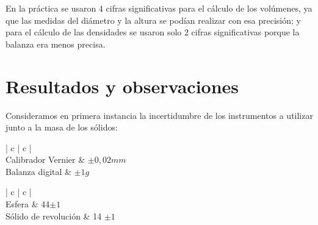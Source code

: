 \documentclass[a4paper]{article}
\begin{document}
En la práctica se usaron 4 cifras significativas para el cálculo de los volúmenes, ya que las medidas del diámetro y la altura se podían realizar con esa precisión; y para el cálculo de las densidades se usaron solo 2 cifras significativas porque la balanza era menos precisa. 

\section{Resultados y observaciones}
Consideramos en primera instancia la incertidumbre de los instrumentos a utilizar junto a la masa de los sólidos:

\begin{table}[H]
\begin{center}
\begin{tabular}{| c | c |}
\hline
{} \\ \hline
Calibrador Vernier & $\pm {0,02mm}$  \\ 
Balanza digital & $\pm {1g}$\\
\hline
\end{tabular}
\caption{Incertidumbres de los instrumentos usados en la práctica.}
\label{table:incertidumbre de instrumentos}
\end{center}
\end{table}

\begin{table}[H]
\begin{center}
\begin{tabular}{| c | c |}
\hline
{} \\ \hline
Esfera & 44$\pm {1}$ \\ 
Sólido de revolución & 14 $\pm {1}$\\
\hline
\end{tabular}
\caption{Masa de los sólidos con sus incertidumbres.}
\label{tab:masa de sólidos}
\end{center}
\end{table}
\end{document}
